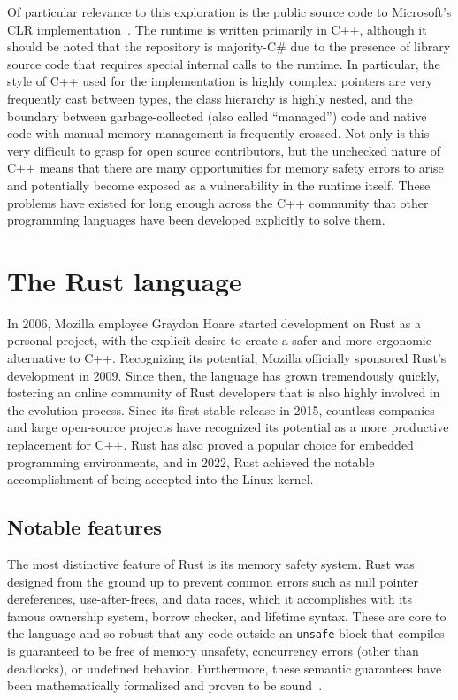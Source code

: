Of particular relevance to this exploration is the public source code to Microsoft's CLR implementation~\cite{runtime}.
The runtime is written primarily in C++, although it should be noted that the repository is majority-C\# due to the presence of
library source code that requires special internal calls to the runtime.
In particular, the style of C++ used for the implementation is highly complex: pointers are very frequently cast between types,
the class hierarchy is highly nested, and the boundary between garbage-collected (also called ``managed'') code and native code with
manual memory management is frequently crossed.
Not only is this very difficult to grasp for open source contributors, but the unchecked nature of C++ means that there are many
opportunities for memory safety errors to arise and potentially become exposed as a vulnerability in the runtime itself.
These problems have existed for long enough across the C++ community that other programming languages have been developed
explicitly to solve them.

\section{The Rust language}
In 2006, Mozilla employee Graydon Hoare started development on Rust as a personal project,
with the explicit desire to create a safer and more ergonomic alternative to C++.
Recognizing its potential, Mozilla officially sponsored Rust's development in 2009.
Since then, the language has grown tremendously quickly,
fostering an online community of Rust developers that is also highly involved in the evolution process.
Since its first stable release in 2015, countless companies and large open-source projects have recognized its potential
as a more productive replacement for C++.
Rust has also proved a popular choice for embedded programming environments, and in 2022,
Rust achieved the notable accomplishment of being accepted into the Linux kernel.

\subsection{Notable features}
The most distinctive feature of Rust is its memory safety system.
Rust was designed from the ground up to prevent common errors such as null pointer dereferences, use-after-frees, and data races,
which it accomplishes with its famous ownership system, borrow checker, and lifetime syntax.
These are core to the language and so robust that any code outside an \texttt{unsafe} block that compiles
is guaranteed to be free of memory unsafety, concurrency errors (other than deadlocks), or undefined behavior.
Furthermore, these semantic guarantees have been mathematically formalized and proven to be sound~\cite{rustbelt}.

